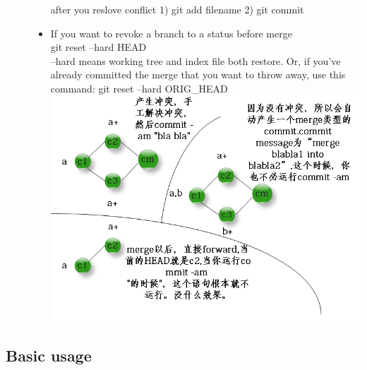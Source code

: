 \documentclass[a4paper,12pt,twoside]{book}
\begin{document}
\begin{description}
\begin{itemize}
after you reslove conflict 1) git add filename 2) git commit


\item If you want to revoke a branch to a status before merge \\
git reset –hard HEAD \\–hard means working tree and index file both restore.
Or, if you've already committed the merge that you want to throw away, use this command: git reset --hard ORIG\_HEAD \\
\includegraphics[scale=0.5]{pics/git-merge} \\

\end{itemize}


\end{description}

\subsection{Basic usage}
\end{document}
